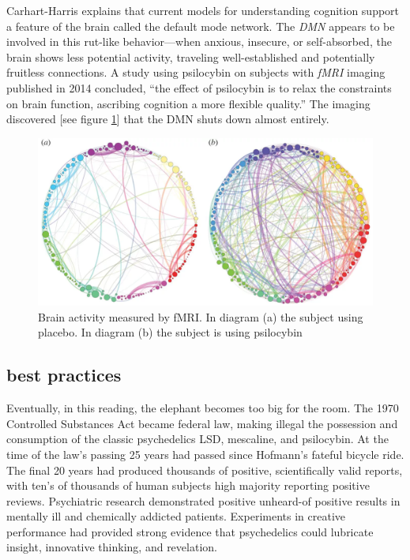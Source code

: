 \documentclass{UIdahoMastersThesis}
\begin{document}
Carhart-Harris explains that current models for understanding cognition support a feature of the brain called the default mode network. The \textit{\ac{DMN}} appears to be involved in this rut-like behavior---when anxious, insecure, or self-absorbed, the brain shows less potential activity, traveling well-established and potentially fruitless connections. A study using psilocybin on subjects with \textit{\ac{fMRI}} imaging published in 2014 concluded, \enquote{the effect of psilocybin is to relax the constraints on brain function, ascribing cognition a more flexible quality.} The imaging discovered [see figure \ref{fig:dmn}] that the DMN shuts down almost entirely. 

\begin{figure}[h!]
	\centering
	\includegraphics[width=\linewidth]{dmn.png}
	\caption{Brain activity measured by fMRI. In diagram (a) the subject using placebo. In diagram (b) the subject is using psilocybin}
	\label{fig:dmn}
\end{figure}

\subsection{best practices}

Eventually, in this reading, the elephant becomes too big for the room. The 1970 Controlled Substances Act became federal law, making illegal the possession and consumption of the classic psychedelics LSD, mescaline, and psilocybin. At the time of the law's passing 25 years had passed since Hofmann's fateful bicycle ride. The final 20 years had produced thousands of positive, scientifically valid reports, with ten's of thousands of human subjects high majority reporting positive reviews. Psychiatric research demonstrated positive unheard-of positive results in mentally ill and chemically addicted patients. Experiments in creative performance had provided strong evidence that psychedelics could lubricate insight, innovative thinking, and revelation.  
\end{document}
